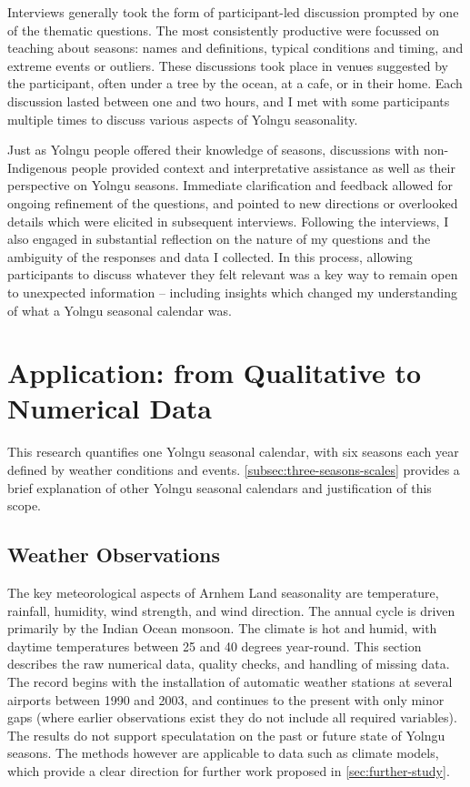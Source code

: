Interviews generally took the form of participant-led discussion prompted
by one of the thematic questions.  The most consistently productive were
focussed on teaching about seasons: names and definitions, typical conditions
and timing, and extreme events or outliers.
%
These discussions took place in venues suggested by the participant, often
under a tree by the ocean, at a cafe, or in their home.  Each discussion
lasted between one and two hours, and I met with some participants multiple times
to discuss various aspects of Yolngu seasonality.

Just as Yolngu people offered their knowledge of seasons, discussions with
non-Indigenous people provided context and interpretative assistance as well
as their perspective on Yolngu seasons.  Immediate clarification and
feedback allowed for ongoing refinement of the questions, and pointed to
new directions or overlooked details which were elicited in subsequent
interviews.
%
Following the interviews, I also engaged in substantial reflection on the nature
of my questions and the ambiguity of the responses and data I collected.
In this process, allowing participants to discuss whatever they felt relevant
was a key way to remain open to unexpected information -- including insights
which changed my understanding of what a Yolngu seasonal calendar was.



\section{Application: from Qualitative to Numerical Data}

This research quantifies one Yolngu seasonal calendar, with six
seasons each year defined by weather conditions and events.
\cref{subsec:three-seasons-scales} provides a brief explanation of other
Yolngu seasonal calendars and justification of this scope.

\subsection{Weather Observations}
\label{ssec:weather-methods}

The key meteorological aspects of Arnhem Land seasonality are temperature,
rainfall, humidity, wind strength, and wind direction.  The annual
cycle is driven primarily by the Indian Ocean monsoon.  The climate is hot and
humid, with daytime temperatures between 25 and 40 degrees year-round.
%
This section describes the raw numerical data, quality checks, and handling of missing data.
The record begins with the installation of automatic weather stations
at several airports between 1990 and 2003, and continues to the present with only
minor gaps (where earlier observations exist they do not include all required
variables).  The results do not support
speculatation on the past or future state of Yolngu seasons.  The methods
however are applicable to data such as climate models, which provide
a clear direction for further work proposed in \cref{sec:further-study}.

